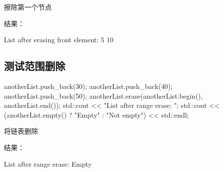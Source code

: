\documentclass[
]{article}
\newenvironment{Shaded}{}{}
\newcommand{\BuiltInTok}[1]{\textcolor[rgb]{0.00,0.50,0.00}{#1}}
\newcommand{\DecValTok}[1]{\textcolor[rgb]{0.25,0.63,0.44}{#1}}
\newcommand{\NormalTok}[1]{#1}
\newcommand{\OperatorTok}[1]{\textcolor[rgb]{0.40,0.40,0.40}{#1}}
\newcommand{\StringTok}[1]{\textcolor[rgb]{0.25,0.44,0.63}{#1}}
\begin{document}
擦除第一个节点

结果：

\begin{Shaded}
\begin{Highlighting}[]
\NormalTok{List after erasing front element: 5 10}
\end{Highlighting}
\end{Shaded}

\hypertarget{ux6d4bux8bd5ux8303ux56f4ux5220ux9664}{%
\subsection{测试范围删除}\label{ux6d4bux8bd5ux8303ux56f4ux5220ux9664}}

\begin{Shaded}
\begin{Highlighting}[]
\NormalTok{anotherList}\OperatorTok{.}\NormalTok{push\_back}\OperatorTok{(}\DecValTok{30}\OperatorTok{);}
\NormalTok{anotherList}\OperatorTok{.}\NormalTok{push\_back}\OperatorTok{(}\DecValTok{40}\OperatorTok{);}
\NormalTok{anotherList}\OperatorTok{.}\NormalTok{push\_back}\OperatorTok{(}\DecValTok{50}\OperatorTok{);}
\NormalTok{anotherList}\OperatorTok{.}\NormalTok{erase}\OperatorTok{(}\NormalTok{anotherList}\OperatorTok{.}\NormalTok{begin}\OperatorTok{(),}\NormalTok{ anotherList}\OperatorTok{.}\NormalTok{end}\OperatorTok{());}
\BuiltInTok{std::}\NormalTok{cout}\OperatorTok{ \textless{}\textless{}} \StringTok{"List after range erase: "}\OperatorTok{;}
\BuiltInTok{std::}\NormalTok{cout}\OperatorTok{ \textless{}\textless{}} \OperatorTok{(}\NormalTok{anotherList}\OperatorTok{.}\NormalTok{empty}\OperatorTok{()} \OperatorTok{?} \StringTok{"Empty"} \OperatorTok{:} \StringTok{"Not empty"}\OperatorTok{)} \OperatorTok{\textless{}\textless{}} \BuiltInTok{std::}\NormalTok{endl}\OperatorTok{;}
\end{Highlighting}
\end{Shaded}

将链表删除

结果：

\begin{Shaded}
\begin{Highlighting}[]
\NormalTok{List after range erase: Empty}
\end{Highlighting}
\end{Shaded}
\end{document}
